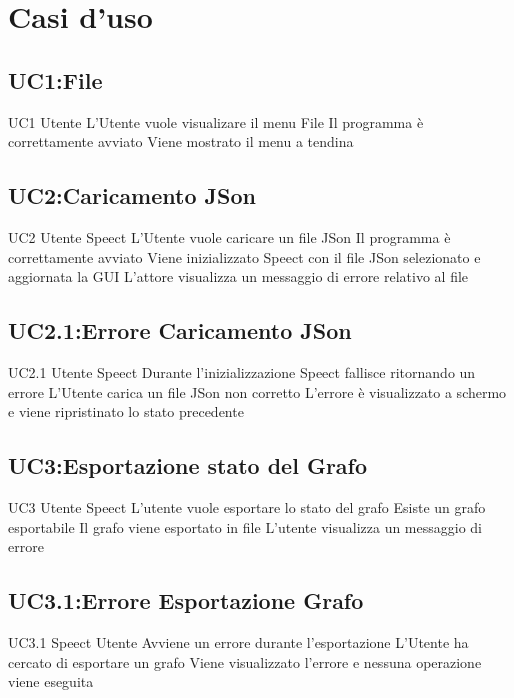 \documentclass[../AnalisideiRequisiti.tex]{subfiles}
\begin{document}
	\chapter{Casi d'uso}
	\section{UC1:File}
	\UserCase
	{UC1}
	{Utente}
	{}
	{L'Utente vuole visualizare il menu File}
	{Il programma è correttamente avviato}
	{Viene mostrato il menu a tendina}
	{}
	{}
	\section{UC2:Caricamento JSon}
	\UserCase
	{UC2}
	{Utente}
	{Speect}
	{L'Utente vuole caricare un file JSon}
	{Il programma è correttamente avviato}
	{Viene inizializzato Speect con il file JSon selezionato e aggiornata la GUI}
	{L'attore visualizza un messaggio di errore relativo al file }
	{}
	\section{UC2.1:Errore Caricamento JSon}
	\UserCase
	{UC2.1}
	{Utente}
	{Speect}
	{Durante l'inizializzazione Speect fallisce ritornando un errore }
	{L'Utente carica un file JSon non corretto}
	{L'errore è visualizzato a schermo e viene ripristinato lo stato precedente}
	{}
	{}
	\section{UC3:Esportazione stato del Grafo}
	\UserCase
	{UC3}
	{Utente}
	{Speect}
	{L'utente vuole esportare lo stato del grafo}
	{Esiste un grafo esportabile}
	{Il grafo viene esportato in file}
	{ L'utente visualizza un messaggio di errore }
	{}
\section{UC3.1:Errore Esportazione Grafo}
\UserCase
{UC3.1}
{Speect}
{Utente}
{Avviene un errore durante l'esportazione}
{L'Utente ha cercato di esportare un grafo}
{Viene visualizzato l'errore e nessuna operazione viene eseguita}
{}
{}
\end{document}
